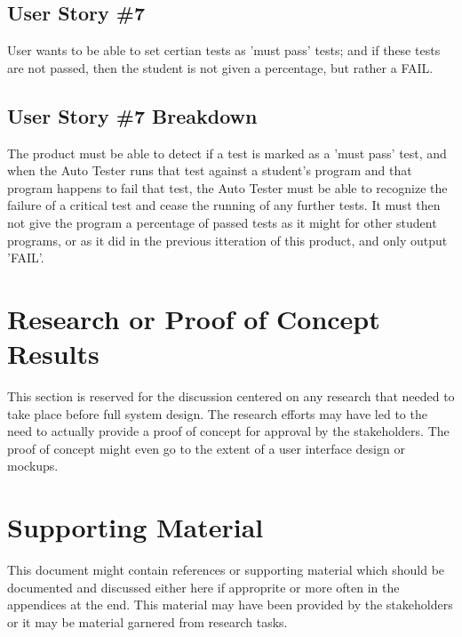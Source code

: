 \subsection{User Story \#7}
User wants to be able to set certian tests as 'must pass' tests; and if these 
tests are not passed, then the student is not given a percentage, but rather a FAIL.

\subsection{User Story \#7 Breakdown}
The product must be able to detect if a test is marked as a 'must pass' test, and when the Auto Tester 
runs that test against a student's program and that program happens to fail that test, the Auto Tester 
must be able to recognize the failure of a critical test and cease the running of any further tests. 
It must then not give the program a percentage of passed tests as it might for other student programs, 
or as it did in the previous itteration of this product, and only output 'FAIL'.


\section{Research or Proof of Concept Results}
This section is reserved for the discussion centered on any research that needed 
to take place before full system design.  The research efforts may have led to 
the need to actually provide a proof of concept for approval by the stakeholders. 
 The proof of concept might even go to the extent of a user interface design or 
mockups.


\section{Supporting Material}
This document might contain references or supporting material which should be documented 
and discussed  either here if approprite or more often in the appendices at the end.  
This material may have been provided by the stakeholders  
or it may be material garnered from research tasks.
